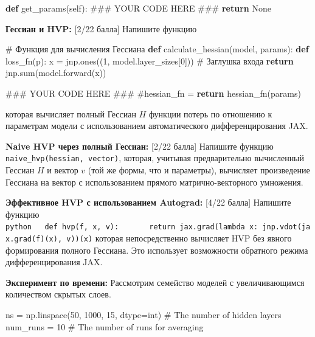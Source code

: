 \documentclass[
  russian,
  letterpaper,
  DIV=11,
  numbers=noendperiod]{scrartcl}
\newenvironment{Shaded}{\begin{snugshade}}{\end{snugshade}}
\newcommand{\AlertTok}[1]{\textcolor[rgb]{0.68,0.00,0.00}{#1}}
\newcommand{\BuiltInTok}[1]{\textcolor[rgb]{0.00,0.23,0.31}{#1}}
\newcommand{\CommentTok}[1]{\textcolor[rgb]{0.37,0.37,0.37}{#1}}
\newcommand{\ControlFlowTok}[1]{\textcolor[rgb]{0.00,0.23,0.31}{\textbf{#1}}}
\newcommand{\DecValTok}[1]{\textcolor[rgb]{0.68,0.00,0.00}{#1}}
\newcommand{\KeywordTok}[1]{\textcolor[rgb]{0.00,0.23,0.31}{\textbf{#1}}}
\newcommand{\NormalTok}[1]{\textcolor[rgb]{0.00,0.23,0.31}{#1}}
\newcommand{\OperatorTok}[1]{\textcolor[rgb]{0.37,0.37,0.37}{#1}}
\newcommand{\VariableTok}[1]{\textcolor[rgb]{0.07,0.07,0.07}{#1}}
\begin{document}
\begin{enumerate}
\begin{Shaded}
\begin{Highlighting}[]
    \KeywordTok{def}\NormalTok{ get\_params(}\VariableTok{self}\NormalTok{):}
        \CommentTok{\#\#\# YOUR CODE HERE }\AlertTok{\#\#\#}
        \ControlFlowTok{return} \VariableTok{None}
\end{Highlighting}
\end{Shaded}

  \textbf{Гессиан и HVP:} {[}2/22 балла{]} Напишите функцию

\begin{Shaded}
\begin{Highlighting}[]
\CommentTok{\# Функция для вычисления Гессиана}
\KeywordTok{def}\NormalTok{ calculate\_hessian(model, params):}
    \KeywordTok{def}\NormalTok{ loss\_fn(p):}
\NormalTok{        x }\OperatorTok{=}\NormalTok{ jnp.ones((}\DecValTok{1}\NormalTok{, model.layer\_sizes[}\DecValTok{0}\NormalTok{]))  }\CommentTok{\# Заглушка входа}
        \ControlFlowTok{return}\NormalTok{ jnp.}\BuiltInTok{sum}\NormalTok{(model.forward(x))}

    \CommentTok{\#\#\# YOUR CODE HERE }\AlertTok{\#\#\#}
    \CommentTok{\#hessian\_fn =           }
    \ControlFlowTok{return}\NormalTok{ hessian\_fn(params)}
\end{Highlighting}
\end{Shaded}

  которая вычисляет полный Гессиан \(H\) функции потерь по отношению к
  параметрам модели с использованием автоматического дифференцирования
  JAX.

  \textbf{Naive HVP через полный Гессиан:} {[}2/22 балла{]} Напишите
  функцию \texttt{naive\_hvp(hessian,\ vector)}, которая, учитывая
  предварительно вычисленный Гессиан \(H\) и вектор \(v\) (той же формы,
  что и параметры), вычисляет произведение Гессиана на вектор с
  использованием прямого матрично-векторного умножения.

  \textbf{Эффективное HVP с использованием Autograd:} {[}4/22 балла{]}
  Напишите функцию
  \texttt{python\ \ \ def\ hvp(f,\ x,\ v):\ \ \ \ \ \ \ return\ jax.grad(lambda\ x:\ jnp.vdot(jax.grad(f)(x),\ v))(x)}
  которая непосредственно вычисляет HVP без явного формирования полного
  Гессиана. Это использует возможности обратного режима
  дифференцирования JAX.

  \textbf{Эксперимент по времени:} Рассмотрим семейство моделей с
  увеличивающимся количеством скрытых слоев.

\begin{Shaded}
\begin{Highlighting}[]
\NormalTok{ns }\OperatorTok{=}\NormalTok{ np.linspace(}\DecValTok{50}\NormalTok{, }\DecValTok{1000}\NormalTok{, }\DecValTok{15}\NormalTok{, dtype}\OperatorTok{=}\BuiltInTok{int}\NormalTok{)  }\CommentTok{\# The number of hidden layers}
\NormalTok{num\_runs }\OperatorTok{=} \DecValTok{10}  \CommentTok{\# The number of runs for averaging}
\end{Highlighting}
\end{Shaded}


\end{enumerate}
\end{document}
